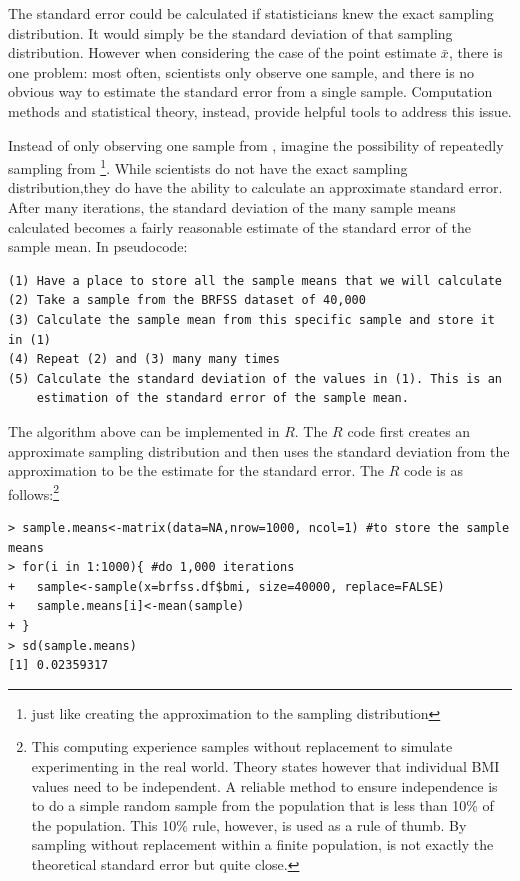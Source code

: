The standard error could be calculated if statisticians knew the exact sampling distribution. It would simply be the standard deviation of that sampling distribution.  However when considering the case of the point estimate $\bar{x}$, there is one problem: most often, scientists only observe one sample, and there is no obvious way to estimate the standard error from a single sample. Computation methods and statistical theory, instead, provide helpful tools to address this issue. 

Instead of only observing one sample from , imagine the possibility of repeatedly sampling from  \footnote{just like creating the approximation to the sampling distribution}. While scientists do not have the exact sampling distribution,they do have the ability to calculate an approximate standard error. After many iterations, the standard deviation of the many sample means calculated becomes a fairly reasonable estimate of the standard error of the sample mean. In pseudocode: 
\begin{verbatim}
(1) Have a place to store all the sample means that we will calculate
(2) Take a sample from the BRFSS dataset of 40,000
(3) Calculate the sample mean from this specific sample and store it in (1)
(4) Repeat (2) and (3) many many times 
(5) Calculate the standard deviation of the values in (1). This is an 
	estimation of the standard error of the sample mean.
\end{verbatim}

The algorithm above can be implemented in $R$. The $R$ code first creates an approximate sampling distribution and then uses the standard deviation from the approximation to be the estimate for the standard error. The $R$ code is as follows:\footnote{This computing experience samples without replacement to simulate experimenting in the real world. Theory states however that individual BMI values need to be independent. A reliable method to ensure independence is to do a simple random sample from the population that is less than 10\% of the population. This 10\% rule, however, is used as a rule of thumb. By sampling without replacement within a finite population, is not exactly the theoretical standard error but quite close.}
\begin{verbatim}
> sample.means<-matrix(data=NA,nrow=1000, ncol=1) #to store the sample means
> for(i in 1:1000){ #do 1,000 iterations
+   sample<-sample(x=brfss.df$bmi, size=40000, replace=FALSE)
+   sample.means[i]<-mean(sample)
+ }
> sd(sample.means)
[1] 0.02359317 
\end{verbatim}

